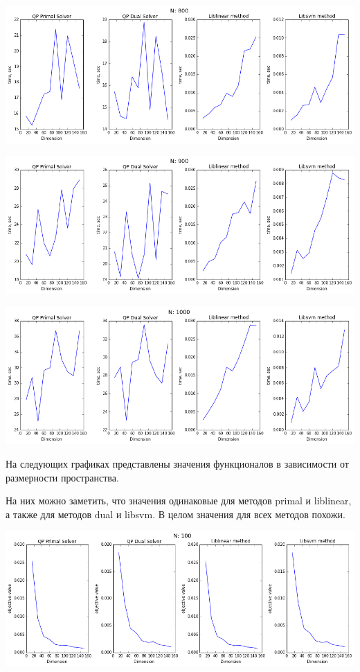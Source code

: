 \documentclass[12pt, a4paper]{article}
\begin{document}
			\begin{center}
				\includegraphics[width=18cm]{1par_N800.png}
			\end{center}

			\begin{center}
				\includegraphics[width=18cm]{1par_N900.png}
			\end{center}

			\begin{center}
				\includegraphics[width=18cm]{1par_N1000.png}
			\end{center}

			На следующих графиках представлены значения функционалов в зависимости от размерности пространства.

			На них можно заметить, что значения одинаковые для методов primal и liblinear, а также для методов dual и libsvm. В целом значения для всех методов похожи.

			\begin{center}
				\includegraphics[width=18cm]{1par_obj_N100.png}
			\end{center}
\end{document}
